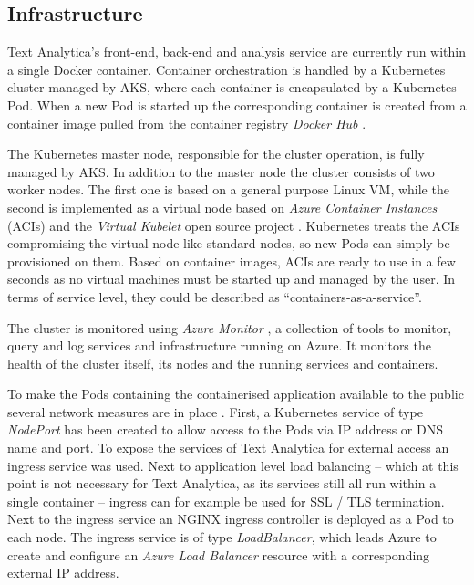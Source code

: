 \documentclass[conference]{IEEEtran}
\begin{document}
\subsection{Infrastructure}
\label{subsec:infra}
Text Analytica's front-end, back-end and analysis service are currently run within a single Docker container. Container orchestration is handled by a Kubernetes cluster managed by AKS, where each container is encapsulated by a Kubernetes Pod. When a new Pod is started up the corresponding container is created from a container image pulled from the container registry \textit{Docker Hub} \cite{DockerHub}.

The Kubernetes master node, responsible for the cluster operation, is fully managed by AKS. In addition to the master node the cluster consists of two worker nodes. The first one is based on a general purpose Linux VM, while the second is implemented as a virtual node based on \textit{Azure Container Instances} (ACIs) \cite{AzureContainerInstances} and the \textit{Virtual Kubelet} open source project \cite{VirtualKubelet, VirtualKubeletGithub}. Kubernetes treats the ACIs compromising the virtual node like standard nodes, so new Pods can simply be provisioned on them. Based on container images, ACIs are ready to use in a few seconds as no virtual machines must be started up and managed by the user. In terms of service level, they could be described as “containers-as-a-service”.

The cluster is monitored using \textit{Azure Monitor} \cite{AzureMonitor}, a collection of tools to monitor, query and log services and infrastructure running on Azure. It monitors the health of the cluster itself, its nodes and the running services and containers.

To make the Pods containing the containerised application available to the public several network measures are in place \cite{AKSNetworks, AzureExposeKubernetesCluster}. First, a Kubernetes service of type \textit{NodePort} has been created to allow access to the Pods via IP address or DNS name and port. To expose the services of Text Analytica for external access an ingress service was used. Next to application level load balancing – which at this point is not necessary for Text Analytica, as its services still all run within a single container – ingress can for example be used for SSL / TLS termination. Next to the ingress service an NGINX ingress controller is deployed as a Pod to each node. The ingress service is of type \textit{LoadBalancer}, which leads Azure to create and configure an \textit{Azure Load Balancer} resource with a corresponding external IP address.
\end{document}
